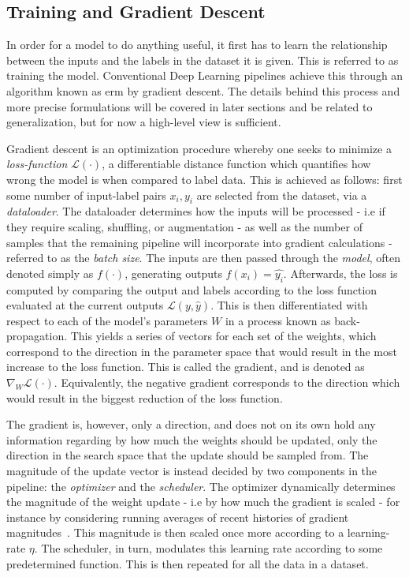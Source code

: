     \subsection{Training and Gradient Descent}
        In order for a model to do anything useful, it first has to learn the relationship between the inputs and the labels in the dataset it is given. This is referred to as training the model. Conventional Deep Learning pipelines achieve this through an algorithm known as \gls{erm} by gradient descent. The details behind this process and more precise formulations will be covered in later sections and be related to generalization, but for now a high-level view is sufficient. 
        
        Gradient descent is an optimization procedure whereby one seeks to minimize a \textit{loss-function} \(\mathcal{L}(\cdot)\), a differentiable distance function which quantifies how wrong the model is when compared to label data. This is achieved as follows: first some number of input-label pairs \({x_i,y_i}\) are selected from the dataset, via a \textit{dataloader}. The dataloader determines how the inputs will be processed - i.e  if they require scaling, shuffling, or augmentation - as well as the number of samples that the remaining pipeline will incorporate into gradient calculations - referred to as the \textit{batch size}. The inputs are then passed through the \textit{model}, often denoted simply as \(f(\cdot)\), generating outputs \(f(x_i)=\hat{y_i}\). Afterwards, the loss is computed by comparing the output and labels according to the loss function evaluated at the current outputs \(\mathcal{L}(y, \hat{y})\). This is then differentiated with respect to each of the model's parameters \(W\) in a process known as back-propagation. This yields a series of vectors for each set of the weights, which correspond to the direction in the parameter space that would result in the most increase to the loss function. This is called the gradient, and is denoted as \(\nabla_{W} \mathcal{L}(\cdot)\). Equivalently, the negative gradient corresponds to the direction which would result in the biggest reduction of the loss function.
        
        The gradient is, however, only a direction, and does not on its own hold any information regarding by how much the weights should be updated, only the direction in the search space that the update should be sampled from. The magnitude of the update vector is instead decided by two components in the pipeline: the \textit{optimizer} and the \textit{scheduler}. The optimizer dynamically determines the magnitude of the weight update - i.e by how much the gradient is scaled - for instance by considering running averages of recent histories of gradient magnitudes~\cite{adam}. This magnitude is then scaled once more according to a learning-rate \(\eta\). The scheduler, in turn, modulates this learning rate according to some predetermined function. This is then repeated for all the data in a dataset. 
    
